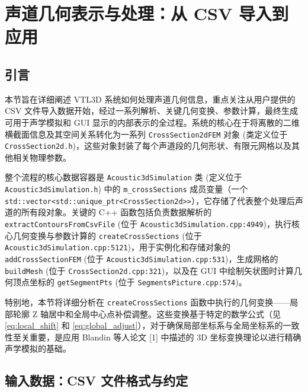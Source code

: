 \documentclass{ctexart}
\begin{document}
\section{声道几何表示与处理：从 CSV 导入到应用}

\subsection{引言}
本节旨在详细阐述 VTL3D 系统如何处理声道几何信息，重点关注从用户提供的 CSV 文件导入数据开始，经过一系列解析、关键几何变换、参数计算，最终生成可用于声学模拟和 GUI 显示的内部表示的全过程。系统的核心在于将离散的二维横截面信息及其空间关系转化为一系列 \texttt{CrossSection2dFEM} 对象 (类定义位于 \texttt{CrossSection2d.h})，这些对象封装了每个声道段的几何形状、有限元网格以及其他相关物理参数。

整个流程的核心数据容器是 \texttt{Acoustic3dSimulation} 类 (定义位于 \texttt{Acoustic3dSimulation.h}) 中的 \texttt{m\_crossSections} 成员变量（一个 \texttt{std::vector<std::unique\_ptr<CrossSection2d>>}），它存储了代表整个处理后声道的所有段对象。关键的 C++ 函数包括负责数据解析的 \texttt{extractContoursFromCsvFile} (位于 \texttt{Acoustic3dSimulation.cpp:4949})，执行核心几何变换与参数计算的 \texttt{createCrossSections} (位于 \texttt{Acoustic3dSimulation.cpp:5121})，用于实例化和存储对象的 \texttt{addCrossSectionFEM} (位于 \texttt{Acoustic3dSimulation.cpp:531})，生成网格的 \texttt{buildMesh} (位于 \texttt{CrossSection2d.cpp:321})，以及在 GUI 中绘制矢状图时计算几何顶点坐标的 \texttt{getSegmentPts} (位于 \texttt{SegmentsPicture.cpp:574})。

特别地，本节将详细分析在 \texttt{createCrossSections} 函数中执行的几何变换——局部轮廓 Z 轴居中和全局中心点补偿调整。这些变换基于特定的数学公式（见 \eqref{eq:local_shift} 和 \eqref{eq:global_adjust}），对于确保局部坐标系与全局坐标系的一致性至关重要，是应用 Blandin 等人论文 [1] 中描述的 3D 坐标变换理论以进行精确声学模拟的基础。

\subsection{输入数据：CSV 文件格式与约定}
\end{document}
